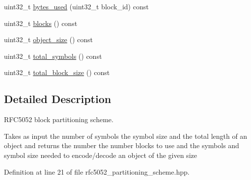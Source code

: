 \begin{DoxyCompactItemize}
uint32\-\_\-t \hyperlink{classkodo_1_1rfc5052__partitioning__scheme_ab616a4bf5a0f8c7c6b0f37e06527529f}{bytes\-\_\-used} (uint32\-\_\-t block\-\_\-id) const 
\begin{DoxyCompactList}\small\item\em \end{DoxyCompactList}\item 
uint32\-\_\-t \hyperlink{classkodo_1_1rfc5052__partitioning__scheme_a7e149bff4f13117646bedcd133cf2b69}{blocks} () const 
\begin{DoxyCompactList}\small\item\em \end{DoxyCompactList}\item 
uint32\-\_\-t \hyperlink{classkodo_1_1rfc5052__partitioning__scheme_a169472a094a76d65f42079a2207265d4}{object\-\_\-size} () const 
\begin{DoxyCompactList}\small\item\em \end{DoxyCompactList}\item 
uint32\-\_\-t \hyperlink{classkodo_1_1rfc5052__partitioning__scheme_a0bc62b5ab235f8bd2a0ed492c2576cff}{total\-\_\-symbols} () const 
\begin{DoxyCompactList}\small\item\em \end{DoxyCompactList}\item 
uint32\-\_\-t \hyperlink{classkodo_1_1rfc5052__partitioning__scheme_a0ee99b22750466351c016424d01f2976}{total\-\_\-block\-\_\-size} () const 
\begin{DoxyCompactList}\small\item\em \end{DoxyCompactList}\end{DoxyCompactItemize}


\subsection{Detailed Description}
R\-F\-C5052 block partitioning scheme. 

Takes as input the number of symbols the symbol size and the total length of an object and returns the number the number blocks to use and the symbols and symbol size needed to encode/decode an object of the given size 

Definition at line 21 of file rfc5052\-\_\-partitioning\-\_\-scheme.\-hpp.



